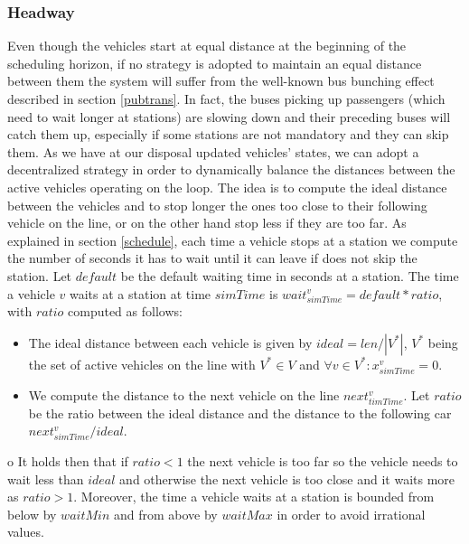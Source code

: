\documentclass[12pt,a4paper]{article}
\begin{document}
\subsubsection{Headway}\label{hw}
Even though the vehicles start at equal distance at the beginning of the scheduling horizon, if no strategy is adopted to maintain an equal distance between them the system will suffer from the well-known bus bunching effect described in section \ref{pubtrans}. In fact, the buses picking up passengers (which need to wait longer at stations) are slowing down and their preceding buses will catch them up, especially if some stations are not mandatory and they can skip them. As we have at our disposal updated vehicles' states, we can adopt a decentralized strategy in order to dynamically balance the distances between the active vehicles operating on the loop. The idea is to compute the ideal distance between the vehicles and to stop longer the ones too close to their following vehicle on the line, or on the other hand stop less if they are too far. As explained in section \ref{schedule}, each time a vehicle stops at a station we compute the number of seconds it has to wait until it can leave if does not skip the station. Let $default$ be the default waiting time in seconds at a station. The time a vehicle $v$ waits at a station at time $simTime$ is $wait^{v}_{simTime} = default * ratio$, with $ratio$ computed as follows:
\begin{itemize}
\setlength\itemsep{1pt}
\item The ideal distance between each vehicle is given by $ideal = len / |V^{*}|$, $V^{*}$ being the set of active vehicles on the line with $V^{*}\in V$ and $\forall v \in V^{*}: x^{v}_{simTime} = 0$. 
\item We compute the distance to the next vehicle on the line $next^{v}_{timTime}$. Let $ratio$ be the ratio between the ideal distance and the distance to the following car $next^{v}_{simTime} / ideal$.
\end{itemize}o
It holds then that if $ratio < 1$ the next vehicle is too far so the vehicle needs to wait less than $ideal$ and otherwise the next vehicle is too close and it waits more as $ratio >1$. Moreover, the time a vehicle waits at a station is bounded from below by $waitMin$ and from above by $waitMax$ in order to avoid irrational values.
\end{document}
